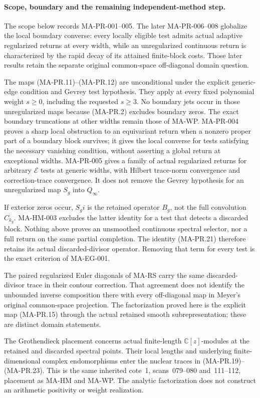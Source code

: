 \paragraph{Scope, boundary and the remaining independent-method step.}
The scope below records MA-PR-001--005.
The later MA-PR-006--008 globalize the local boundary
converse: every locally eligible test admits actual
adaptive regularized returns at every width, while
an unregularized continuous return is characterized
by the rapid decay of its attained finite-block costs.
Those later results retain the separate original
common-space off-diagonal domain question.

The maps (MA-PR.11)--(MA-PR.12) are unconditional under
the explicit generic-edge condition and Gevrey test
hypothesis.  They apply at every fixed polynomial
weight $s\ge0$, including the requested $s\ge3$.
No boundary jets occur in those unregularized maps
because (MA-PR.2) excludes boundary zeros.
The exact boundary truncations at other widths
remain those of MA-WP.  MA-PR-004 proves a sharp
local obstruction to an equivariant return when
a nonzero proper part of a boundary block survives;
it gives the local converse for tests satisfying
the necessary vanishing condition, without
asserting a global return at exceptional widths.
MA-PR-005 gives a family of actual regularized
returns for arbitrary $\mathcal E$ tests at
generic widths, with Hilbert trace-norm convergence
and correction-trace convergence.  It does not
remove the Gevrey hypothesis for an unregularized
map $S_g$ into $Q_\infty$.

If exterior zeros occur, $S_gi$ is the retained
operator $B_g$, not the full convolution $C_{k_g}$.
MA-HM-003 excludes the latter identity for a test
that detects a discarded block.
Nothing above proves an unsmoothed continuous
spectral selector, nor a full return on the same
partial completion.  The identity (MA-PR.21)
therefore retains its actual discarded-divisor
operator.  Removing that term for every test is
the exact criterion of MA-EG-001.

The paired regularized Euler diagonals of MA-RS
carry the same discarded-divisor trace in their
contour correction.  That agreement does not
identify the unbounded inverse composition there
with every off-diagonal map in Meyer's original
common-space projection.  The factorization
proved here is the explicit map (MA-PR.15) through
the actual retained smooth subrepresentation;
these are distinct domain statements.

The Grothendieck placement concerns actual finite-length
$\mathbb C[z]$-modules at the retained and discarded
spectral points.  Their local lengths and underlying
finite-dimensional complex endomorphisms enter the
nuclear traces in (MA-PR.19)--(MA-PR.23).
This is the same inherited cote~1, scans~079--080
and~111--112, placement as MA-HM and MA-WP.
The analytic factorization does not construct an
arithmetic positivity or weight realization.

